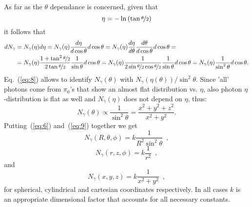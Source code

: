 As far as the $\theta$ dependance is concerned, given that 
\begin{equation}
\eta = -\ln \left( \tan \nicefrac{\theta}{2} \right)
\label{eq:7}
\end{equation}
it follows that
\begin{equation}
\begin{split}
dN_\gamma & = N_\gamma(\eta) d\eta  =
N_\gamma(\eta)\frac{d\eta}{d\cos\theta} d\cos\theta = N_\gamma(\eta)\frac{d\eta}{d\theta}\frac{d\theta}{d\cos\theta} d\cos\theta=\\ 
 & =N_\gamma(\eta)\frac{1+\tan^2\nicefrac[]{\theta}{2}
 }{2\tan\nicefrac{\theta}{2}} \frac{1}{\sin\theta} d\cos\theta =
 N_\gamma(\eta)\frac{1}{2\sin\nicefrac[]{\theta}{2}\cos\nicefrac[]{\theta}{2}} \frac{1}{\sin\theta}  d\cos\theta  
 = N_\gamma(\eta)\frac{1}{\sin^2\theta}  d\cos\theta .
\label{eq:8}
\end{split}
\end{equation}
Eq.~(\ref{eq:8}) allows to identify $N_\gamma(\theta)$ with $N_\gamma(\eta(\theta))/\sin^2{\theta}$.
Since 'all' photons come from $\pi_0$'s that show an almost flat
distribution vs. $\eta$, also photon $\eta$-distribution is flat as
well and $N_\gamma(\eta)$ does not depend on $\eta$, thus:
\begin{equation}
N_\gamma(\theta) \propto \frac{1}{\sin^2 \theta} = \frac{x^2+y^2+z^2}{x^2+y^2}.
\label{eq:9}
\end{equation}
Putting~(\ref{eq:6}) and~(\ref{eq:9}) together we get 
\begin{equation}
N_{\gamma} (R, \theta, \phi) = k \frac{1}{R^2\sin^2 \theta} \, \, \, ,
\label{eq:10pre}
\end{equation}
\begin{equation}
N_{\gamma} (r, z, \phi) = k \frac{1}{r^2} \,\,\, ,
\label{eq:10bis}
\end{equation}
and
\begin{equation}
N_{\gamma} (x, y, z) = k \frac{1}{x^2+y^2} \,\,\, ,
\label{eq:10tris}
\end{equation}
for spherical,
cylindrical and cartesian coordinates
respectively. In all cases $k$ is an appropriate dimensional factor
that accounts for all necessary constants.

